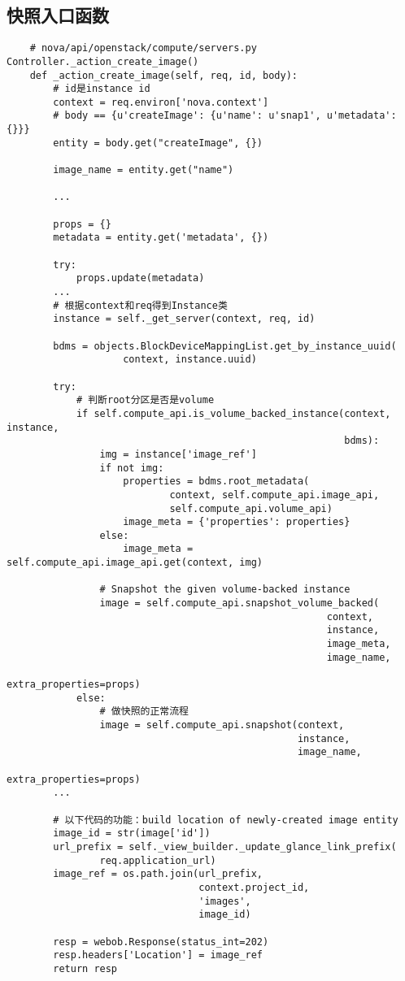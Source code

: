 \documentclass[a4paper,left=1.5cm,right=1.5cm,11pt]{article}
\begin{document}
\subsection{快照入口函数}
    \begin{lstlisting}
    # nova/api/openstack/compute/servers.py Controller._action_create_image()
    def _action_create_image(self, req, id, body):
        # id是instance id
        context = req.environ['nova.context']
        # body == {u'createImage': {u'name': u'snap1', u'metadata': {}}}
        entity = body.get("createImage", {})

        image_name = entity.get("name")

        ...

        props = {}
        metadata = entity.get('metadata', {})
        
        try:
            props.update(metadata)
        ...
        # 根据context和req得到Instance类
        instance = self._get_server(context, req, id)

        bdms = objects.BlockDeviceMappingList.get_by_instance_uuid(
                    context, instance.uuid)

        try:
            # 判断root分区是否是volume
            if self.compute_api.is_volume_backed_instance(context, instance,
                                                          bdms):
                img = instance['image_ref']
                if not img:
                    properties = bdms.root_metadata(
                            context, self.compute_api.image_api,
                            self.compute_api.volume_api)
                    image_meta = {'properties': properties}
                else:
                    image_meta = self.compute_api.image_api.get(context, img)
                
                # Snapshot the given volume-backed instance
                image = self.compute_api.snapshot_volume_backed(
                                                       context,
                                                       instance,
                                                       image_meta,
                                                       image_name,
                                                       extra_properties=props)
            else:
                # 做快照的正常流程
                image = self.compute_api.snapshot(context,
                                                  instance,
                                                  image_name,
                                                  extra_properties=props)
        ...

        # 以下代码的功能：build location of newly-created image entity
        image_id = str(image['id'])
        url_prefix = self._view_builder._update_glance_link_prefix(
                req.application_url)
        image_ref = os.path.join(url_prefix,
                                 context.project_id,
                                 'images',
                                 image_id)

        resp = webob.Response(status_int=202)
        resp.headers['Location'] = image_ref
        return resp
    \end{lstlisting}
\end{document}
